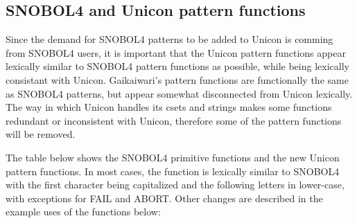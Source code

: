 \documentclass{article}
\begin{document}
\vspace{1 pc}
\subsection{SNOBOL4 and Unicon pattern functions}
Since the demand for SNOBOL4 patterns to be added to Unicon is comming from SNOBOL4 users, it is important that the Unicon pattern functions appear lexically similar to SNOBOL4 pattern functions as possible, while being lexically consistant with Unicon.  Gaikaiwari's pattern functions 
are functionally the same as SNOBOL4 patterns, but appear somewhat disconnected from Unicon lexically.  The way in which Unicon handles its csets and strings makes some functions redundant or inconsistent with Unicon, therefore some of the pattern functions will be removed. 

The table below shows the SNOBOL4 primitive functions and the new Unicon pattern functions.  In most cases, the function is lexically similar to SNOBOL4 with the first character being capitalized and the following letters in lower-case, with exceptions for FAIL and ABORT.  Other changes are described in the example uses of the functions below: 
\end{document}
